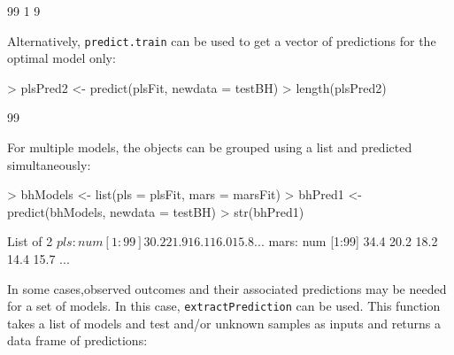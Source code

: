 \documentclass[12pt]{article}
\begin{document}
\begin{small}
\begin{Schunk}
\begin{Soutput}
[1] 99  1  9
\end{Soutput}
\end{Schunk}
\end{small}
Alternatively, \texttt{predict.train} can be used to get a vector of predictions for the optimal model only:
\begin{small}
\begin{Schunk}
\begin{Sinput}
> plsPred2 <- predict(plsFit, newdata = testBH)
> length(plsPred2)
\end{Sinput}
\begin{Soutput}
[1] 99
\end{Soutput}
\end{Schunk}
\end{small}
For multiple models, the objects can be grouped using a list and predicted simultaneously:
\begin{small}
\begin{Schunk}
\begin{Sinput}
> bhModels <- list(pls = plsFit, mars = marsFit)
> bhPred1 <- predict(bhModels, newdata = testBH)
> str(bhPred1)
\end{Sinput}
\begin{Soutput}
List of 2
 $ pls : num [1:99] 30.2 21.9 16.1 16.0 15.8 ...
 $ mars: num [1:99] 34.4 20.2 18.2 14.4 15.7 ...
\end{Soutput}
\end{Schunk}
\end{small}
In some cases,observed outcomes and their associated predictions may be needed for a set of models. In this case, \texttt{extractPrediction} can be used. This function takes a list of models and test and/or unknown samples as inputs and returns a data frame of predictions:
\end{document}
